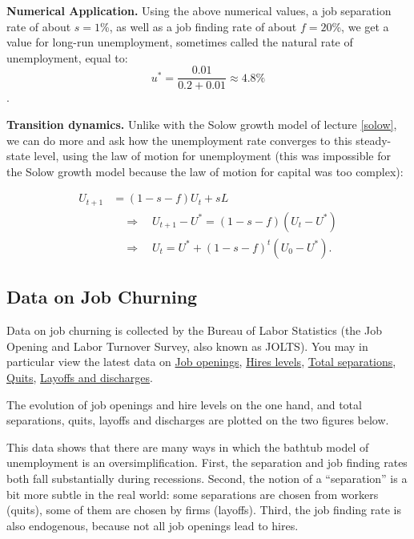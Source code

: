 \documentclass[]{book}
\theoremstyle{definition}
\theoremstyle{definition}
\theoremstyle{definition}
\theoremstyle{remark}
\begin{document}
\textbf{Numerical Application.} Using the above numerical values, a job
separation rate of about \(s=1\)\%, as well as a job finding rate of
about \(f=20\)\%, we get a value for long-run unemployment, sometimes
called the natural rate of unemployment, equal to:
\[u^{*}=\frac{0.01}{0.2 + 0.01}\approx 4.8\%\].

\textbf{Transition dynamics.} Unlike with the Solow growth model of
lecture \ref{solow}, we can do more and ask how the unemployment rate
converges to this steady-state level, using the law of motion for
unemployment (this was impossible for the Solow growth model because the
law of motion for capital was too complex):

\[
\begin{aligned}
U_{t+1}&=\left(1-s-f\right)U_{t}+sL\\
& \quad\Rightarrow\quad U_{t+1}-U^{*}=\left(1-s-f\right)\left(U_{t}-U^{*}\right)\\
    & \quad\Rightarrow\quad U_{t}=U^{*}+\left(1-s-f\right)^{t}\left(U_{0}-U^{*}\right).
\end{aligned}
\]

\subsection{Data on Job Churning}\label{data-on-job-churning}

Data on job churning is collected by the Bureau of Labor Statistics (the
Job Opening and Labor Turnover Survey, also known as JOLTS). You may in
particular view the latest data on
\href{https://www.bls.gov/news.release/jolts.t01.htm}{Job openings},
\href{https://www.bls.gov/news.release/jolts.t02.htm}{Hires levels},
\href{https://www.bls.gov/news.release/jolts.t03.htm}{Total
separations},
\href{https://www.bls.gov/news.release/jolts.t04.htm}{Quits},
\href{https://www.bls.gov/news.release/jolts.t05.htm}{Layoffs and
discharges}.

The evolution of job openings and hire levels on the one hand, and total
separations, quits, layoffs and discharges are plotted on the two
figures below.

This data shows that there are many ways in which the bathtub model of
unemployment is an oversimplification. First, the separation and job
finding rates both fall substantially during recessions. Second, the
notion of a ``separation'' is a bit more subtle in the real world: some
separations are chosen from workers (quits), some of them are chosen by
firms (layoffs). Third, the job finding rate is also endogenous, because
not all job openings lead to hires.
\end{document}
